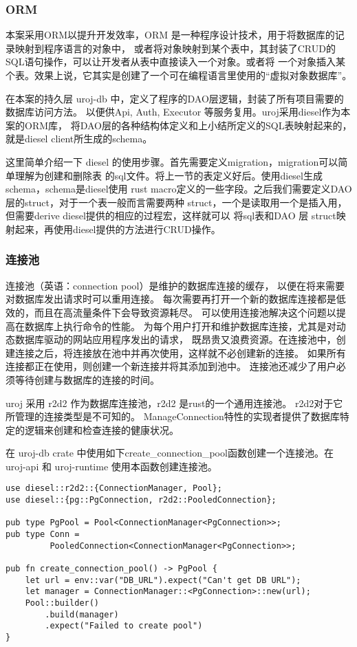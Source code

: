 \subsubsection{ORM}
本案采用ORM以提升开发效率，ORM 是一种程序设计技术，用于将数据库的记录映射到程序语言的对象中，
或者将对象映射到某个表中，其封装了CRUD的SQL语句操作，可以让开发者从表中直接读入一个对象。或者将
一个对象插入某个表。效果上说，它其实是创建了一个可在编程语言里使用的“虚拟对象数据库”。

在本案的持久层 uroj-db 中，定义了程序的DAO层逻辑，封装了所有项目需要的数据库访问方法。
以便供Api, Auth, Executor 等服务复用。uroj采用diesel作为本案的ORM库，
将DAO层的各种结构体定义和上小结所定义的SQL表映射起来的，
就是diesel client所生成的schema。

这里简单介绍一下 diesel 的使用步骤。首先需要定义migration，migration可以简单理解为创建和删除表
的sql文件。将上一节的表定义好后。使用diesel生成schema，schema是diesel使用
rust macro定义的一些字段。之后我们需要定义DAO层的struct，对于一个表一般而言需要两种
struct，一个是读取用一个是插入用，但需要derive diesel提供的相应的过程宏，这样就可以
将sql表和DAO 层 struct映射起来，再使用diesel提供的方法进行CRUD操作。

\subsubsection{连接池}
连接池（英语：connection pool）是维护的数据库连接的缓存，
以便在将来需要对数据库发出请求时可以重用连接。
每次需要再打开一个新的数据库连接都是低效的，而且在高流量条件下会导致资源耗尽。
可以使用连接池解决这个问题以提高在数据库上执行命令的性能\cite{zhong2005database}。
为每个用户打开和维护数据库连接，尤其是对动态数据库驱动的网站应用程序发出的请求，
既昂贵又浪费资源。在连接池中，创建连接之后，将连接放在池中并再次使用，这样就不必创建新的连接。
如果所有连接都正在使用，则创建一个新连接并将其添加到池中。
连接池还减少了用户必须等待创建与数据库的连接的时间。

uroj 采用 r2d2 作为数据库连接池，r2d2 是rust的一个通用连接池。
r2d2对于它所管理的连接类型是不可知的。
ManageConnection特性的实现者提供了数据库特定的逻辑来创建和检查连接的健康状况。

在 uroj-db crate 中使用如下create\_connection\_pool函数创建一个连接池。在
uroj-api 和 uroj-runtime 使用本函数创建连接池。
\begin{lstlisting}
use diesel::r2d2::{ConnectionManager, Pool};
use diesel::{pg::PgConnection, r2d2::PooledConnection};

pub type PgPool = Pool<ConnectionManager<PgConnection>>;
pub type Conn =
         PooledConnection<ConnectionManager<PgConnection>>;

pub fn create_connection_pool() -> PgPool {
    let url = env::var("DB_URL").expect("Can't get DB URL");
    let manager = ConnectionManager::<PgConnection>::new(url);
    Pool::builder()
        .build(manager)
        .expect("Failed to create pool")
}
\end{lstlisting}

